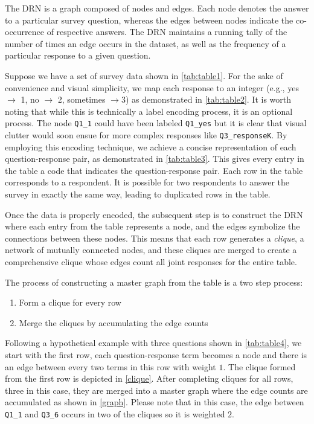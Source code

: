 The DRN is a graph composed of nodes and edges. Each node denotes the answer to a particular survey question, whereas the edges between nodes indicate the co-occurrence of respective answers.  The DRN maintains a running tally of the number of times an edge occurs in the dataset, as well as the frequency of a particular response to a given question.

Suppose we have a set of survey data shown in \autoref{tab:table1}. For the sake of convenience and visual simplicity, we map each response to an integer (e.g., yes $\to$ 1, no $\to$ 2, sometimes $\rightarrow 3$) as demonstrated in \autoref{tab:table2}. It is worth noting that while this is technically a label encoding process, it is an optional process. The node \texttt{Q1\_1} could have been labeled \texttt{Q1\_yes} but it is clear that visual clutter would soon ensue for more complex responses like \texttt{Q3\_responseK}. By employing this encoding technique, we achieve a concise representation of each question-response pair, as demonstrated in \autoref{tab:table3}. This gives every entry in the table a code that indicates the question-response pair. Each row in the table corresponds to a respondent. It is possible for two respondents to answer the survey in exactly the same way, leading to duplicated rows in the table.

Once the data is properly encoded, the subsequent step is to construct the DRN where each entry from the table represents a node, and the edges symbolize the connections between these nodes. This means that each row generates a \textit{clique}, a network of mutually connected nodes, and these cliques are merged to create a comprehensive clique whose edges count all joint responses for the entire table.

The process of constructing a master graph from the table is a two step process:
\begin{enumerate}
    \item Form a clique for every row
    \item Merge the cliques by accumulating the edge counts
\end{enumerate}
\noindent Following a hypothetical example with three questions shown in \autoref{tab:table4}, we start with the first row, each question-response term becomes a node and there is an edge between every two terms in this row with weight $1$. The clique formed from the first row is depicted in \autoref{clique}. After completing cliques for all rows, three in this case, they are merged into a master graph where the edge counts are accumulated as shown in \autoref{graph}. Please note that in this case, the edge between \texttt{Q1\_1} and \texttt{Q3\_6} occurs in two of the cliques so it is weighted $2$.

